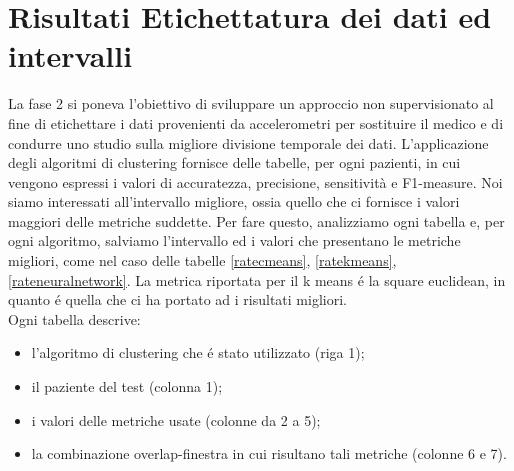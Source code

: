 \section{Risultati Etichettatura dei dati ed intervalli}
La fase 2 si poneva l'obiettivo di sviluppare un approccio non supervisionato al fine di etichettare i dati provenienti da accelerometri per sostituire il medico e di condurre uno studio sulla migliore divisione temporale dei dati. L'applicazione degli algoritmi di clustering fornisce delle tabelle, per ogni pazienti, in cui vengono espressi i valori di accuratezza, precisione, sensitività e F1-measure. Noi siamo interessati all'intervallo migliore, ossia quello che ci fornisce i valori maggiori delle metriche suddette. Per fare questo, analizziamo ogni tabella e, per ogni algoritmo, salviamo l'intervallo ed i valori che presentano le metriche migliori, come nel caso delle tabelle \ref{ratecmeans}, \ref{ratekmeans}, \ref{rateneuralnetwork}. La metrica riportata per il k means é la square euclidean, in quanto é quella che ci ha portato ad i risultati migliori. \\
Ogni tabella descrive:
\begin{itemize}
	\item l'algoritmo di clustering che é stato utilizzato (riga 1);
	\item il paziente del test (colonna 1);
	\item i valori delle metriche usate (colonne da 2 a 5);
	\item la combinazione overlap-finestra in cui risultano tali metriche (colonne 6 e 7).
\end{itemize}

